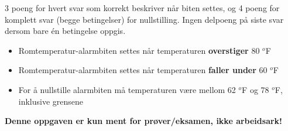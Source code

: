 3 poeng for hvert svar som korrekt beskriver når biten settes, og 4 poeng for komplett svar (begge betingelser) for nullstilling. Ingen delpoeng på siste svar dersom bare én betingelse oppgis.

\begin{itemize}
\item{} Romtemperatur-alarmbiten settes når temperaturen {\bf overstiger} 80 $^{o}$F
\vskip 10pt
\item{} Romtemperatur-alarmbiten settes når temperaturen {\bf faller under} 60 $^{o}$F
\vskip 10pt
\item{} For å nullstille alarmbiten må temperaturen være mellom 62 $^{o}$F og 78 $^{o}$F, inklusive grensene
\end{itemize}







{\bf Denne oppgaven er kun ment for prøver/eksamen, ikke arbeidsark!}


